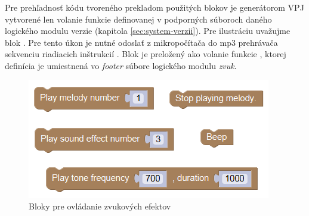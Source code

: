 Pre prehľadnosť kódu tvoreného prekladom použitých blokov je generátorom VPJ vytvorené len volanie funkcie definovanej v podporných súboroch daného logického modulu verzie (kapitola \ref{sec:system-verzii}). Pre ilustráciu uvažujme blok . Pre tento úkon je nutné odoslať z mikropočítača do mp3 prehrávača sekvenciu riadiacich inštrukcií \cite{DFPlayerMini}. Blok je preložený ako  volanie funkcie , ktorej definícia je umiestnená vo \textit{footer} súbore logického modulu \textit{zvuk}.


\vspace{2cm}

\begin{figure}[bh!]
\centerline{\includegraphics[]{images/sound-blocks}}
\caption[Bloky pre ovládanie zvukových efektov]{Bloky pre ovládanie zvukových efektov}
\label{obr:sound-blocks}
\end{figure}

%
%
%
%  
%

